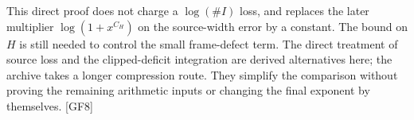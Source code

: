 This direct proof does not charge a $\log(\#I)$ loss, and replaces the
later multiplier $\log(1+x^{C_H})$ on the source-width error by a constant.
The bound on $H$ is still needed to control the small frame-defect term.
The direct treatment of source loss and the clipped-deficit integration are
derived alternatives here; the archive takes a longer compression route.
They simplify the comparison without proving the remaining arithmetic
inputs or changing the final exponent by themselves. \textsf{[GF8]}
